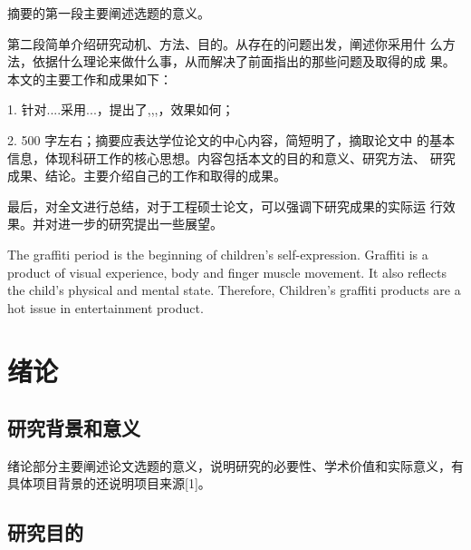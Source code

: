\documentclass[12pt]{zjutthesis}
\begin{document}
\zjutpreface

\begin{AbstractCn}
  摘要的第一段主要阐述选题的意义。

  第二段简单介绍研究动机、方法、目的。从存在的问题出发，阐述你采用什
  么方法，依据什么理论来做什么事，从而解决了前面指出的那些问题及取得的成
  果。本文的主要工作和成果如下：

  1. 针对....采用...，提出了,,,，效果如何；

  2. 500 字左右；摘要应表达学位论文的中心内容，简短明了，摘取论文中
  的基本信息，体现科研工作的核心思想。内容包括本文的目的和意义、研究方法、
  研究成果、结论。主要介绍自己的工作和取得的成果。

  最后，对全文进行总结，对于工程硕士论文，可以强调下研究成果的实际运
  行效果。并对进一步的研究提出一些展望。

\end{AbstractCn}


\begin{AbstractEn}
  The graffiti period is the beginning of children's self-expression. Graffiti is a
  product of visual experience, body and finger muscle movement. It also reflects the
  child's physical and mental state. Therefore, Children's graffiti products are a hot issue
  in entertainment product.

\end{AbstractEn}


\frontmatter
\tableofcontents
\clearpage
\listoffigures
\listoffigureEng
\clearpage
\listoftables
\listoftableEng


\mainmatter
\chapter{绪论}
\section{研究背景和意义}
绪论部分主要阐述论文选题的意义，说明研究的必要性、学术价值和实际意义，有具体项目背景的还说明项目来源[1]。
\section{研究目的}
\end{document}
